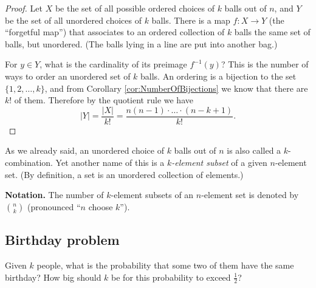 \begin{page}
\setcounter{section}{2}
\setcounter{subsection}{5}
\setcounter{dfn}{11}
\label{portion:56}

\begin{proof}
Let $X$ be the set of all possible ordered choices of $k$ balls out of $n$,
and $Y$ be the set of all unordered choices of $k$ balls.
There is a map $f \colon X \to Y$ (the ``forgetful map'') that associates to
an ordered collection of $k$ balls the same set of balls, but unordered.
(The balls lying in a line are put into another bag.)

For $y \in Y$, what is the cardinality of its preimage $f^{-1}(y)$?
This is the number of ways to order an unordered set of $k$ balls.
An ordering is a bijection to the set $\{1, 2, \ldots, k\}$, and from Corollary \ref{cor:NumberOfBijections} we know that there are $k!$ of them.
Therefore by the quotient rule we have
\[
|Y| = \frac{|X|}{k!} = \frac{n(n-1)\cdot \ldots \cdot (n-k+1)}{k!}.
\]
\end{proof}

As we already said, an unordered choice of $k$ balls out of $n$ is also called a $k$-combination.
Yet another name of this is a \emph{$k$-element subset} of a given $n$-element set.
(By definition, a set is an unordered collection of elements.)

\smallskip

\noindent\textbf{Notation.}
The number of $k$-element subsets of an $n$-element set is denoted by $\binom{n}{k}$
(pronounced ``$n$ choose $k$'').




\end{page}

\begin{page}
\setcounter{section}{3}
\setcounter{subsection}{0}
\setcounter{dfn}{11}
\label{portion:57}

\subsection{Birthday problem}
Given $k$ people, what is the probability that some two of them have the same birthday?
How big should $k$ be for this probability to exceed $\frac12$?











\end{page}

